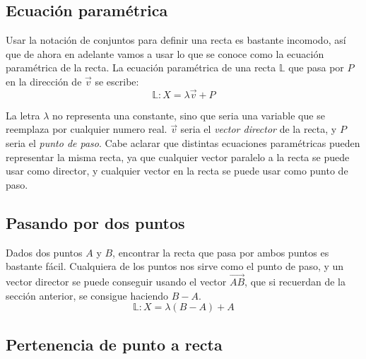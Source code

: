 \documentclass[../teoria.root.tex]{subfiles}
\begin{document}
\subsection{Ecuación paramétrica}

Usar la notación de conjuntos para definir una recta es bastante incomodo, así
que de ahora en adelante vamos a usar lo que se conoce como la ecuación
paramétrica de la recta. La ecuación paramétrica de una recta $\mathbb{L}$ que
pasa por $P$ en la dirección de $\vec{v}$ se escribe:
\[\mathbb{L}:X=\lambda\vec{v}+P\]

La letra $\lambda$ no representa una constante, sino que seria una variable que
se reemplaza por cualquier numero real. $\vec{v}$ seria el \textit{vector
director} de la recta, y $P$ seria el \textit{punto de paso}. Cabe aclarar que
distintas ecuaciones paramétricas pueden representar la misma recta, ya que
cualquier vector paralelo a la recta se puede usar como director, y cualquier
vector en la recta se puede usar como punto de paso.

\subsection{Pasando por dos puntos}

Dados dos puntos $A$ y $B$, encontrar la recta que pasa por ambos puntos es
bastante fácil. Cualquiera de los puntos nos sirve como el punto de paso, y un
vector director se puede conseguir usando el vector $\vec{AB}$, que si
recuerdan de la sección anterior, se consigue haciendo $B-A$.
\[\mathbb{L}:X=\lambda(B-A)+A\]

\begin{center}
\end{center}

\subsection{Pertenencia de punto a recta}
\end{document}
